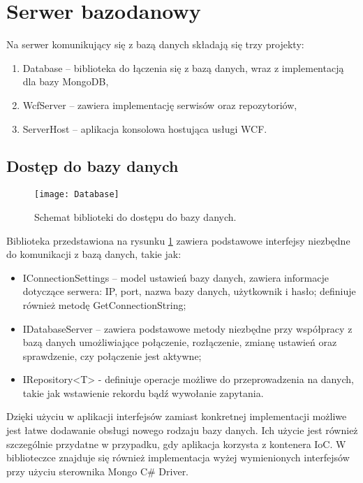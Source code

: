 \section{Serwer bazodanowy}
Na serwer komunikujący się z bazą danych składają się trzy projekty:
\begin{enumerate}
    \item Database – biblioteka do łączenia się z bazą danych, wraz z implementacją dla bazy MongoDB,
    \item WcfServer – zawiera implementację serwisów oraz repozytoriów,
    \item ServerHost – aplikacja konsolowa hostująca usługi WCF.
\end{enumerate}

\subsection{Dostęp do bazy danych}
 
\begin{figure}[htbp]
\centering
\texttt{[image: Database]}
\caption{Schemat biblioteki do dostępu do bazy danych.}
\label{fig:database}
\end{figure}
 
Biblioteka przedstawiona na rysunku \ref{fig:database} zawiera podstawowe interfejsy niezbędne do komunikacji z bazą danych, takie jak:
\begin{itemize}
\item IConnectionSettings – model ustawień bazy danych, zawiera informacje dotyczące serwera: IP, port, nazwa bazy danych, użytkownik i hasło; definiuje również metodę GetConnectionString;
\item IDatabaseServer – zawiera podstawowe metody niezbędne przy współpracy z bazą danych umożliwiające połączenie, rozłączenie, zmianę ustawień oraz sprawdzenie, czy połączenie jest aktywne;
\item IRepository<T> - definiuje operacje możliwe do przeprowadzenia na danych, takie jak wstawienie rekordu bądź wywołanie zapytania.
\end{itemize}

Dzięki użyciu w aplikacji interfejsów zamiast konkretnej implementacji możliwe jest łatwe dodawanie obsługi nowego rodzaju bazy danych. Ich użycie jest również szczególnie przydatne w przypadku, gdy aplikacja korzysta z kontenera IoC. W biblioteczce znajduje się również implementacja wyżej wymienionych interfejsów przy użyciu sterownika Mongo C{\#} Driver.

